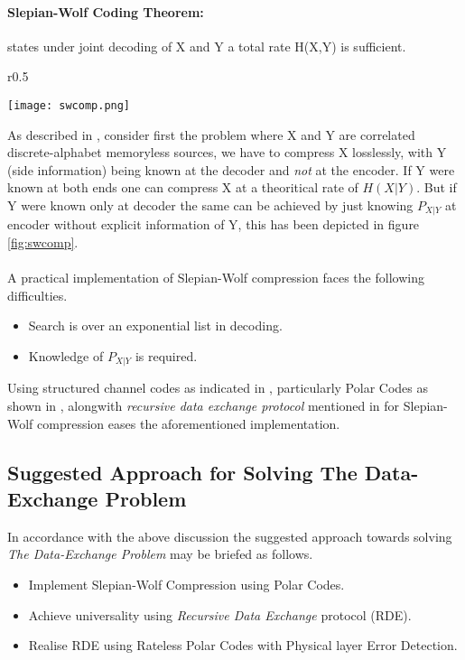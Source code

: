 \documentclass[
11pt, %
a4paper, %
oneside, %
headinclude,footinclude, %
BCOR5mm, %
]{scrartcl}
\begin{document}
\paragraph{Slepian-Wolf Coding Theorem:}states under joint decoding of X and Y a total rate H(X,Y) is sufficient.\\
\begin{wrapfigure}{r}{0.5\textwidth}
  \begin{center}
    \texttt{[image: swcomp.png]}
  \end{center}
  \caption{The Slepian-Wolf Compression}
  \label{fig:swcomp}
\end{wrapfigure}
As described in \cite{discus}, consider first the problem where X and Y are correlated discrete-alphabet memoryless sources, we have to compress X losslessly, with Y (side information) being known at the decoder and \emph{not} at the encoder. If Y were known at both ends one can compress X at a theoritical rate of $H(X|Y)$. But if Y were known only at decoder the same can be achieved by just knowing $P_{X|Y}$ at encoder without explicit information of Y, this has been depicted in figure \ref{fig:swcomp}. 
\\\\
A practical implementation of Slepian-Wolf compression faces the following difficulties.
\begin{itemize}
\item Search is over an exponential list in decoding.
\item Knowledge of $P_{X|Y}$ is required.
\end{itemize} 

Using structured channel codes as indicated in \cite{discus}, particularly Polar Codes as shown in \cite{pslep}, alongwith \emph{recursive data exchange protocol}  mentioned in \cite{htsw} for Slepian-Wolf compression eases the aforementioned implementation. 

\subsection{Suggested Approach for Solving The Data-Exchange Problem}\label{suggapp}
In accordance with the above discussion the suggested approach towards solving \emph{The Data-Exchange Problem} may be briefed as follows.
\begin{itemize}
\item{Implement Slepian-Wolf Compression using Polar Codes.}
\item{Achieve universality using \emph{Recursive Data Exchange} protocol (RDE).}
\item{Realise RDE using Rateless Polar Codes with Physical layer Error Detection.}
\end{itemize}
\end{document}
